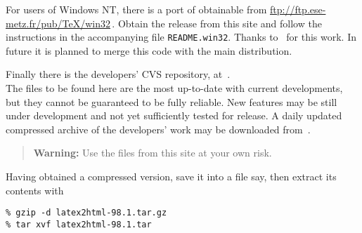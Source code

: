 \bigskip
{}%
\noindent
{}\begin{changebar}%
For users of Windows NT, there is a port of \latextohtml{} obtainable
from \url{ftp://ftp.ese-metz.fr/pub/TeX/win32}\,. Obtain the release from
this site and follow the instructions in the accompanying file
\texttt{README.win32}. \html{\\}Thanks to \Popineau\ for this work.\html{\\} 
In future it is planned to merge this code with the main distribution.
\end{changebar}

\bigskip
{}\label{cvsrepos}%
\noindent
{}\begin{changebar}%
Finally there is the \latextohtml{} developers' CVS repository, at \CVSrepos\,.\\
The files to be found here are the most up-to-date with current developments,
but they cannot be guaranteed to be fully reliable. New features may be
still under development and not yet sufficiently tested for release.
A daily updated compressed archive of the developers' work may be
downloaded from \CVSlatest\,.

\begin{quote}
\textbf{Warning: }Use the files from this site at your own risk.
\end{quote}%
\end{changebar}

\htmlrule{}%
\medskip\noindent
Having obtained a compressed  version, save it into a file 
 say,
then extract its contents with 
\begin{small}
\begin{verbatim}
% gzip -d latex2html-98.1.tar.gz
% tar xvf latex2html-98.1.tar
\end{verbatim} 
\end{small}
%

